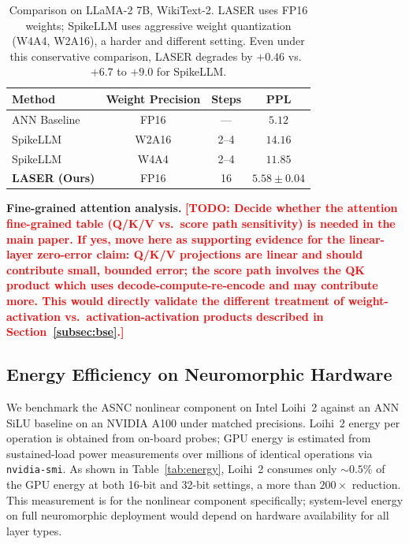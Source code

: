 \documentclass{article}
\theoremstyle{plain}
\theoremstyle{definition}
\theoremstyle{remark}
\begin{document}
\begin{table}[h!]
\centering
\caption{Comparison on LLaMA-2 7B, WikiText-2. LASER uses FP16 weights; SpikeLLM
uses aggressive weight quantization (W4A4, W2A16), a harder and different setting.
Even under this conservative comparison, LASER degrades by $+0.46$ vs.\ $+6.7$ to
$+9.0$ for SpikeLLM.}
\label{tab:comparison}
\small
\begin{tabular}{lccc}
\toprule
\textbf{Method} & \textbf{Weight Precision} & \textbf{Steps} & \textbf{PPL} \\
\midrule
ANN Baseline              & FP16  & ---  & $5.12$ \\
SpikeLLM                  & W2A16 & 2--4 & $14.16$ \\
SpikeLLM                  & W4A4  & 2--4 & $11.85$ \\
\textbf{LASER (Ours)}     & FP16  & 16   & $\mathbf{5.58 \pm 0.04}$ \\
\bottomrule
\end{tabular}
\end{table}

\noindent\textbf{Fine-grained attention analysis.}
\textcolor{red}{\textbf{[TODO: Decide whether the attention fine-grained table
(Q/K/V vs.\ score path sensitivity) is needed in the main paper. If yes, move here as
supporting evidence for the linear-layer zero-error claim: Q/K/V projections are
linear and should contribute small, bounded error; the score path involves the QK
product which uses decode-compute-re-encode and may contribute more. This would
directly validate the different treatment of weight-activation vs.\
activation-activation products described in Section~\ref{subsec:bse}.]}}


\subsection{Energy Efficiency on Neuromorphic Hardware}
\label{subsec:exp_energy}

We benchmark the ASNC nonlinear component on Intel Loihi~2 against an ANN SiLU
baseline on an NVIDIA A100 under matched precisions. Loihi~2 energy per operation is
obtained from on-board probes; GPU energy is estimated from sustained-load power
measurements over millions of identical operations via \texttt{nvidia-smi}. As shown
in Table~\ref{tab:energy}, Loihi~2 consumes only ${\sim}0.5\%$ of the GPU energy at
both 16-bit and 32-bit settings, a more than $200\times$ reduction. This measurement
is for the nonlinear component specifically; system-level energy on full neuromorphic
deployment would depend on hardware availability for all layer types.
\end{document}
